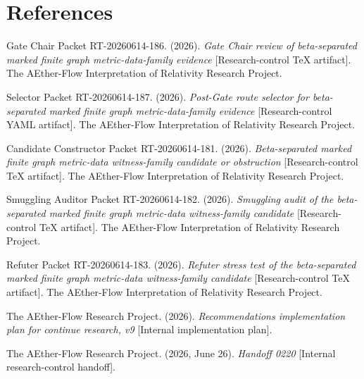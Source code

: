 \documentclass[11pt]{article}
\begin{document}
\section{References}

Gate Chair Packet RT-20260614-186. (2026). \textit{Gate Chair review of
beta-separated marked finite graph metric-data-family evidence}
[Research-control TeX artifact]. The AEther-Flow Interpretation of Relativity
Research Project.

Selector Packet RT-20260614-187. (2026). \textit{Post-Gate route selector for
beta-separated marked finite graph metric-data-family evidence}
[Research-control YAML artifact]. The AEther-Flow Interpretation of Relativity
Research Project.

Candidate Constructor Packet RT-20260614-181. (2026). \textit{Beta-separated
marked finite graph metric-data witness-family candidate or obstruction}
[Research-control TeX artifact]. The AEther-Flow Interpretation of Relativity
Research Project.

Smuggling Auditor Packet RT-20260614-182. (2026). \textit{Smuggling audit of
the beta-separated marked finite graph metric-data witness-family candidate}
[Research-control TeX artifact]. The AEther-Flow Interpretation of Relativity
Research Project.

Refuter Packet RT-20260614-183. (2026). \textit{Refuter stress test of the
beta-separated marked finite graph metric-data witness-family candidate}
[Research-control TeX artifact]. The AEther-Flow Interpretation of Relativity
Research Project.

The AEther-Flow Research Project. (2026). \textit{Recommendations
implementation plan for continue research, v9} [Internal implementation
plan].

The AEther-Flow Research Project. (2026, June 26). \textit{Handoff 0220}
[Internal research-control handoff].
\end{document}

